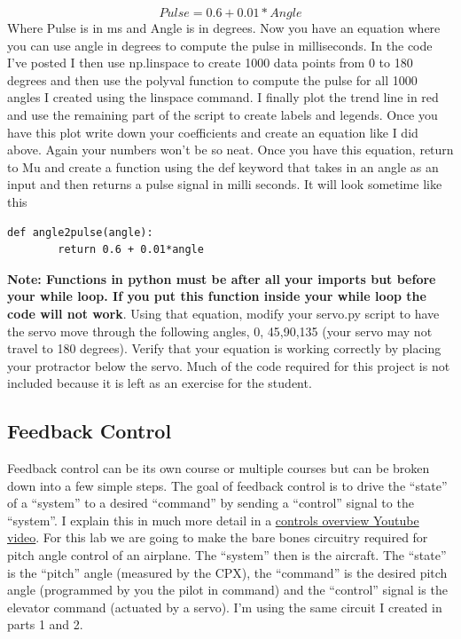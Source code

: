 \begin{equation}
Pulse = 0.6 + 0.01*Angle
\end{equation}
Where Pulse is in ms and Angle is in degrees. Now you have an equation where you can use angle in degrees to compute the pulse in milliseconds. In the code I’ve posted I then use np.linspace to create 1000 data points from 0 to 180 degrees and then use the polyval function to compute the pulse for all 1000 angles I created using the linspace command. I finally plot the trend line in red and use the remaining part of the script to create labels and legends. Once you have this plot write down your coefficients and create an equation like I did above. Again your numbers won’t be so neat. Once you have this equation, return to Mu and create a function using the def keyword that takes in an angle as an input and then returns a pulse signal in milli seconds. It will look sometime like this
\begin{verbatim}
def angle2pulse(angle):
        return 0.6 + 0.01*angle
\end{verbatim}
{\bf Note: Functions in python must be after all your imports but before your while loop. If you put this function inside your while loop the code will not work}. Using that equation, modify your servo.py script to have the servo move through the following angles, 0, 45,90,135 (your servo may not travel to 180 degrees). Verify that your equation is working correctly by placing your protractor below the servo. Much of the code required for this project is not included because it is left as an exercise for the student.

\subsection{Feedback Control}

Feedback control can be its own course or multiple courses but can be
broken down into a few simple steps. The goal of feedback control is
to drive the “state” of a “system” to a desired “command” by sending a
“control” signal to the “system”. I explain this in much more detail
in a
\href{https://www.youtube.com/watch?v=PAK5V8wzVXY&list=PL_D7_GvGz-v30U58EUUOdJGgO4u75DXoB&index=1}{controls
  overview Youtube video}. For this lab we are going to make the bare
bones circuitry required for pitch angle control of an airplane. The
“system” then is the aircraft. The “state” is the “pitch” angle
(measured by the CPX), the “command” is the desired pitch angle
(programmed by you the pilot in command) and the “control” signal is
the elevator command (actuated by a servo). I’m using the same circuit
I created in parts 1 and 2.


